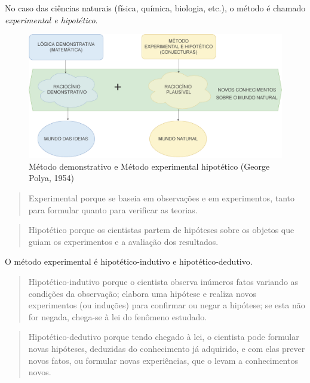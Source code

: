 \documentclass[
]{book}
\begin{document}
No caso das ciências naturais (física, química, biologia, etc.), o método é chamado \emph{experimental e hipotético}.

\hfill\break

\begin{figure}

{\centering \includegraphics[width=0.8\linewidth]{images11/polya} 

}

\caption{Método demonstrativo e Método experimental hipotético (George Polya, 1954) }\label{fig:unnamed-chunk-114}
\end{figure}

\hfill\break

\begin{quote}
Experimental porque se baseia em observações e em experimentos, tanto para formular quanto para verificar as teorias.
\end{quote}

\hfill\break

\begin{quote}
Hipotético porque os cientistas partem de hipóteses sobre os objetos que guiam os experimentos e a avaliação dos resultados.
\end{quote}

\hfill\break

O método experimental é hipotético-indutivo e hipotético-dedutivo.

\hfill\break

\begin{quote}
Hipotético-indutivo porque o cientista observa inúmeros fatos variando as condições da observação; elabora uma hipótese e realiza novos experimentos (ou induções) para confirmar ou negar a hipótese; se esta não for negada, chega-se à lei do fenômeno estudado.
\end{quote}

\hfill\break

\begin{quote}
Hipotético-dedutivo porque tendo chegado à lei, o cientista pode formular novas hipóteses, deduzidas do conhecimento já adquirido, e com elas prever novos fatos, ou formular novas experiências, que o levam a conhecimentos novos.
\end{quote}
\end{document}
